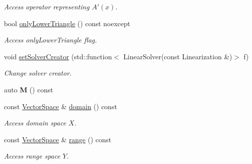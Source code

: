 \begin{DoxyCompactItemize}
\begin{DoxyCompactList}\small\item\em \-Access operator representing $A'(x)$. \end{DoxyCompactList}\item 
bool \hyperlink{classSpacy_1_1Kaskade_1_1DynamicC1Operator_a790124ad6b035750e819cdc0718e9af3}{only\-Lower\-Triangle} () const noexcept
\begin{DoxyCompactList}\small\item\em \-Access only\-Lower\-Triangle flag. \end{DoxyCompactList}\item 
void \hyperlink{classSpacy_1_1Kaskade_1_1DynamicC1Operator_a4a440be1a20133c2d7cb8c6382656172}{set\-Solver\-Creator} (std\-::function$<$ \-Linear\-Solver(const \-Linearization \&)$>$ f)
\begin{DoxyCompactList}\small\item\em \-Change solver creator. \end{DoxyCompactList}\item 
\hypertarget{classSpacy_1_1Kaskade_1_1DynamicC1Operator_a197de5e4e1bfbdd4759be55afcdb8090}{auto {\bfseries \-M} () const }\label{classSpacy_1_1Kaskade_1_1DynamicC1Operator_a197de5e4e1bfbdd4759be55afcdb8090}

\item 
\hypertarget{classSpacy_1_1OperatorBase_a2588f9b3e0188820c4c494e63293dc6f}{const \hyperlink{classSpacy_1_1VectorSpace}{\-Vector\-Space} \& \hyperlink{classSpacy_1_1OperatorBase_a2588f9b3e0188820c4c494e63293dc6f}{domain} () const }\label{classSpacy_1_1OperatorBase_a2588f9b3e0188820c4c494e63293dc6f}

\begin{DoxyCompactList}\small\item\em \-Access domain space $X$. \end{DoxyCompactList}\item 
\hypertarget{classSpacy_1_1OperatorBase_ab19d3b7a6f290b1079248f1e567e53d6}{const \hyperlink{classSpacy_1_1VectorSpace}{\-Vector\-Space} \& \hyperlink{classSpacy_1_1OperatorBase_ab19d3b7a6f290b1079248f1e567e53d6}{range} () const }\label{classSpacy_1_1OperatorBase_ab19d3b7a6f290b1079248f1e567e53d6}

\begin{DoxyCompactList}\small\item\em \-Access range space $Y$. \end{DoxyCompactList}\end{DoxyCompactItemize}


